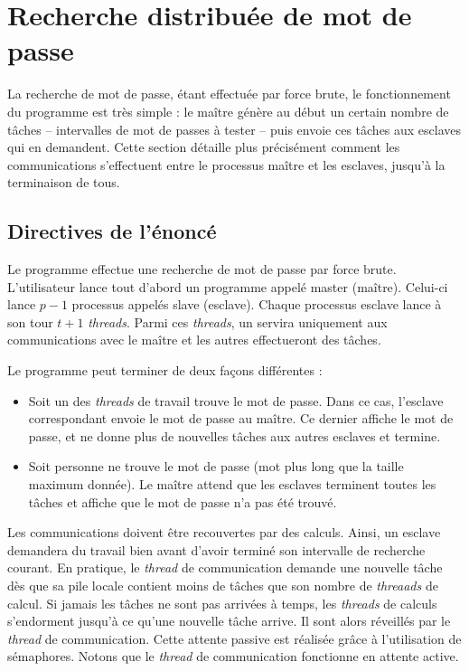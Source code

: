 \section{Recherche distribuée de mot de passe} %
\label{sec:recherche_de_mot_de_passe}

La recherche de mot de passe, étant effectuée par force brute, le fonctionnement du programme est très simple : le maître génère au début un certain nombre de tâches -- intervalles de mot de passes à tester -- puis envoie ces tâches aux esclaves qui en demandent. Cette section détaille plus précisément comment les communications s'effectuent entre le processus maître et les esclaves, jusqu'à la terminaison de tous.

\subsection{Directives de l'énoncé} %
\label{sub:enonce}

Le programme effectue une recherche de mot de passe par force brute. L'utilisateur lance tout d'abord un programme appelé master (maître). Celui-ci lance $p-1$ processus appelés slave (esclave). Chaque processus esclave lance à son tour $t+1$ \emph{threads}. Parmi ces \emph{threads}, un servira uniquement aux communications avec le maître et les autres effectueront des tâches. 

Le programme peut terminer de deux façons différentes :
\begin{itemize}
	\item Soit un des \emph{threads} de travail trouve le mot de passe. Dans ce cas, l'esclave correspondant envoie le mot de passe au maître. Ce dernier affiche le mot de passe, et ne donne plus de nouvelles tâches aux autres esclaves et termine.
	\item Soit personne ne trouve le mot de passe (mot plus long que la taille maximum donnée). Le maître attend que les esclaves terminent toutes les tâches et affiche que le mot de passe n'a pas été trouvé.
\end{itemize}

Les communications doivent être recouvertes par des calculs. Ainsi, un esclave demandera du travail bien avant d'avoir terminé son intervalle de recherche courant. En pratique, le \emph{thread} de communication demande une nouvelle tâche dès que sa pile locale contient moins de tâches que son nombre de \emph{threaads} de calcul. Si jamais les tâches ne sont pas arrivées à temps, les \emph{threads} de calculs s'endorment jusqu'à ce qu'une nouvelle tâche arrive. Il sont alors réveillés par le \emph{thread} de communication. Cette attente passive est réalisée grâce à l'utilisation de sémaphores. Notons que le \emph{thread} de communication fonctionne en attente active.

